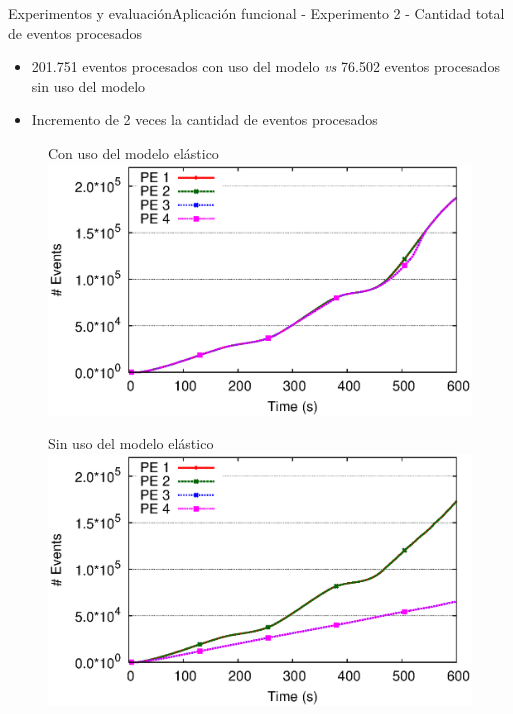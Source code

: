 \begin{frame}{Experimentos y evaluación}{Aplicación funcional - Experimento 2 - Cantidad total de eventos procesados}

\begin{itemize}
\item 201.751 eventos procesados con uso del modelo \textit{vs} 76.502 eventos procesados sin uso del modelo
\item Incremento de 2 veces la cantidad de eventos procesados
\end{itemize}

\begin{multicols}{2}
\begin{figure}[p]
	\centering
	{\scriptsize Con uso del modelo elástico\\}
	\includegraphics[scale=0.4]{images/exp/app1/dynamic/adaptative/exp2-eventCount.eps}
\end{figure}

\begin{figure}[p]
	\centering
	{\scriptsize Sin uso del modelo elástico\\}
	\includegraphics[scale=0.4]{images/exp/app1/dynamic/baseline/exp2-eventCount.eps}
\end{figure}
\end{multicols}
\end{frame}

